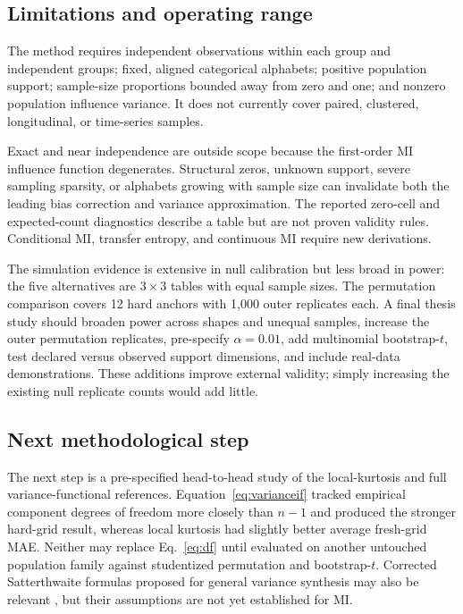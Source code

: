 \documentclass[10pt,twocolumn]{article}
\begin{document}
\subsection{Limitations and operating range}

The method requires independent observations within each group and independent
groups; fixed, aligned categorical alphabets; positive population support;
sample-size proportions bounded away from zero and one; and nonzero
population influence variance. It does not currently cover paired,
clustered, longitudinal, or time-series samples.

Exact and near independence are outside scope because the first-order MI
influence function degenerates. Structural zeros, unknown support, severe
sampling sparsity, or alphabets growing with sample size can invalidate both
the leading bias correction and variance approximation. The reported
zero-cell and expected-count diagnostics describe a table but are not proven
validity rules. Conditional MI, transfer entropy, and continuous MI require
new derivations.

The simulation evidence is extensive in null calibration but less broad in
power: the five alternatives are \(3\times3\) tables with equal sample sizes.
The permutation comparison covers 12 hard anchors with 1,000 outer replicates
each. A final thesis study should broaden power across shapes and unequal
samples, increase the outer permutation replicates, pre-specify
\(\alpha=0.01\), add multinomial bootstrap-\(t\), test declared versus
observed support dimensions, and include real-data demonstrations. These
additions improve external validity; simply increasing the existing null
replicate counts would add little.

\subsection{Next methodological step}

The next step is a pre-specified head-to-head study of the local-kurtosis and
full variance-functional references. Equation~\eqref{eq:varianceif} tracked
empirical component degrees of freedom more closely than \(n-1\) and produced
the stronger hard-grid result, whereas local kurtosis had slightly better
average fresh-grid MAE. Neither may replace Eq.~\eqref{eq:df} until evaluated
on another untouched population family against studentized permutation and
bootstrap-\(t\). Corrected Satterthwaite formulas proposed for general
variance synthesis may also be relevant \citep{vondavier2026}, but their
assumptions are not yet established for MI.
\end{document}
